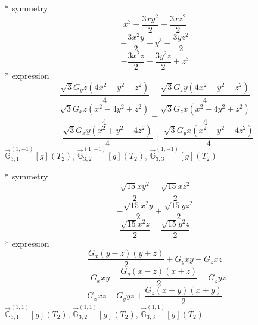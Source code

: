 \documentclass[fleqn,8pt]{jsarticle}
\begin{document}
\noindent\quad ** symmetry
\begin{dmath*}
x^{3} - \frac{3 x y^{2}}{2} - \frac{3 x z^{2}}{2}
\end{dmath*}
\begin{dmath*}
- \frac{3 x^{2} y}{2} + y^{3} - \frac{3 y z^{2}}{2}
\end{dmath*}
\begin{dmath*}
- \frac{3 x^{2} z}{2} - \frac{3 y^{2} z}{2} + z^{3}
\end{dmath*}
\noindent\quad ** expression
\begin{dmath*}
\frac{\sqrt{3} G_{y} z \left(4 x^{2} - y^{2} - z^{2}\right)}{4} - \frac{\sqrt{3} G_{z} y \left(4 x^{2} - y^{2} - z^{2}\right)}{4}
\end{dmath*}
\begin{dmath*}
\frac{\sqrt{3} G_{x} z \left(x^{2} - 4 y^{2} + z^{2}\right)}{4} - \frac{\sqrt{3} G_{z} x \left(x^{2} - 4 y^{2} + z^{2}\right)}{4}
\end{dmath*}
\begin{dmath*}
- \frac{\sqrt{3} G_{x} y \left(x^{2} + y^{2} - 4 z^{2}\right)}{4} + \frac{\sqrt{3} G_{y} x \left(x^{2} + y^{2} - 4 z^{2}\right)}{4}
\end{dmath*}
\noindent\quad $\vec{\mathbb{G}}_{3,1}^{(1,-1)}[g](T_{2})$, $\vec{\mathbb{G}}_{3,2}^{(1,-1)}[g](T_{2})$, $\vec{\mathbb{G}}_{3,3}^{(1,-1)}[g](T_{2})$

\noindent\quad ** symmetry
\begin{dmath*}
\frac{\sqrt{15} x y^{2}}{2} - \frac{\sqrt{15} x z^{2}}{2}
\end{dmath*}
\begin{dmath*}
- \frac{\sqrt{15} x^{2} y}{2} + \frac{\sqrt{15} y z^{2}}{2}
\end{dmath*}
\begin{dmath*}
\frac{\sqrt{15} x^{2} z}{2} - \frac{\sqrt{15} y^{2} z}{2}
\end{dmath*}
\noindent\quad ** expression
\begin{dmath*}
\frac{G_{x} \left(y - z\right) \left(y + z\right)}{2} + G_{y} x y - G_{z} x z
\end{dmath*}
\begin{dmath*}
- G_{x} x y - \frac{G_{y} \left(x - z\right) \left(x + z\right)}{2} + G_{z} y z
\end{dmath*}
\begin{dmath*}
G_{x} x z - G_{y} y z + \frac{G_{z} \left(x - y\right) \left(x + y\right)}{2}
\end{dmath*}
\noindent\quad $\vec{\mathbb{G}}_{3,1}^{(1,1)}[g](T_{2})$, $\vec{\mathbb{G}}_{3,2}^{(1,1)}[g](T_{2})$, $\vec{\mathbb{G}}_{3,3}^{(1,1)}[g](T_{2})$
\end{document}
